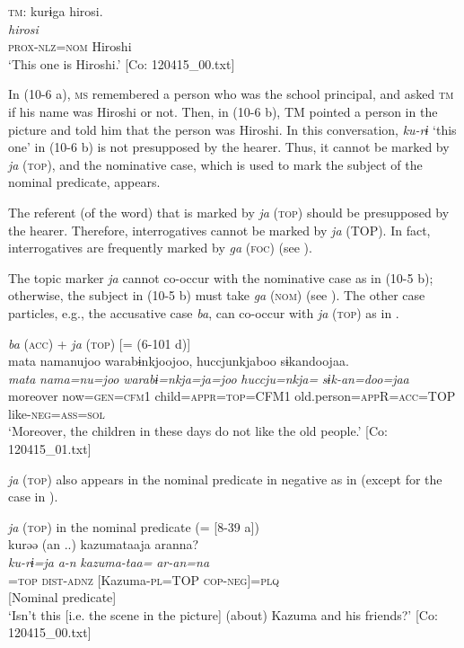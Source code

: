   \ex  \textsc{tm}: \glll    kurɨga  hirosi.\\
      \textit{}  \textit{hirosi}\\
      \textsc{prox}-\textsc{nlz}=\textsc{nom}  Hiroshi\\
      \glt       ‘This one is Hiroshi.’ [Co: 120415\_00.txt]
    \z
\z

In (10-6 a), \textsc{ms} remembered a person who was the school principal, and asked \textsc{tm} if his name was Hiroshi or not. Then, in (10-6 b), TM pointed a person in the picture and told him that the person was Hiroshi. In this conversation, \textit{ku-rɨ} ‘this one’ in (10-6 b) is not presupposed by the hearer. Thus, it cannot be marked by \textit{ja} (\textsc{top}), and the nominative case, which is used to mark the subject of the nominal predicate, appears.

  The referent (of the word) that is marked by \textit{ja} (\textsc{top}) should be presupposed by the hearer. Therefore, interrogatives cannot be marked by \textit{ja} (TOP). In fact, interrogatives are frequently marked by \textit{ga} (\textsc{foc}) (see ).

  The topic marker \textit{ja} cannot co-occur with the nominative case as in (10-5 b); otherwise, the subject in (10-5 b) must take \textit{ga} (\textsc{nom}) (see ). The other case particles, e.g., the accusative case \textit{ba}, can co-occur with \textit{ja} (\textsc{top}) as in .

\ea\label{ex:10.7}   \textit{ba} (\textsc{acc}) + \textit{ja} (\textsc{top}) [= (6-101 d)]\\
      \glll    mata  namanujoo  warabɨnkjoojoo, huccjunkjaboo  sɨkandoojaa.\\
    \textit{mata}  \textit{nama=nu=joo}  \textit{warabɨ=nkja=ja=joo}    \textit{huccju=nkja=}  \textit{sɨk-an=doo=jaa}\\
    moreover  now=\textsc{gen}=\textsc{cfm}1  child=\textsc{appr}=\textsc{top}=CFM1  old.person=\textsc{app}R=\textsc{acc}=TOP  like-\textsc{neg}=\textsc{ass}=\textsc{sol}\\
\glt     ‘Moreover, the children in these days do not like the old people.’  [Co: 120415\_01.txt]
\z

  \textit{ja} (\textsc{top}) also appears in the nominal predicate in negative as in  (except for the case in ).

\ea\label{ex:10.8}   \textit{ja} (\textsc{top}) in the nominal predicate (= [8-39 a])\\
      \gllll    kurəə  {(an ..)}  kazumataaja  aranna?\\
    \textit{ku-rɨ=ja}  \textit{a-n}  \textit{kazuma-taa=}  \textit{ar-an=na}\\
    [\textsc{prox}-\textsc{nlz}]=\textsc{top}  \textsc{dist}-\textsc{adnz}  [Kazuma-\textsc{pl}=TOP  \textsc{cop}-\textsc{neg}]=\textsc{plq}\\
    [Subject]    [Nominal predicate]\\
    \glt ‘Isn’t this [i.e. the scene in the picture] (about) Kazuma and his friends?’ [Co: 120415\_00.txt]
\z    

